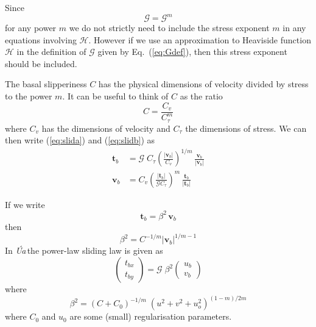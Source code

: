 \documentclass[10pt,a4paper]{book}
\newcommand{\He}{\mathcal{H}}
\newcommand{\G}{\mathcal{G}}
\newcommand{\Ua}{\textsl{\'Ua}\,}
\begin{document}
Since
\[
\G=\G^m
\]
for any power $m$ we do not strictly need to include the stress
exponent $m$ in any equations involving $\He$. However if we use an
approximation to Heaviside function $\He$ in the definition of $\G$
given by Eq.~(\ref{eq:Gdef}), then this stress exponent should be
included.

The basal slipperiness $C$ has the physical dimensions of velocity divided by
stress to the power $m$. It can be useful to think of $C$ as the ratio
\[
C= \frac{C_v}{C_{\tau}^m}
\]
where $C_v$ has the dimensions of velocity and $C_{\tau}$ the
dimensions of stress.  We can then write (\ref{eq:slida}) and
(\ref{eq:slidb}) as
\begin{align}
  \bm{t}_b   & = \G \; C_{\tau} \left ( \frac{| \bm{v}_b|}{C_v} \right )^{1/m} \, \frac{\bm{v}_b}{| \bm{v}_b | } \label{eq:slida1} \\
  \bm{v}_b   & =  C_v  \left ( \frac{ | \bm{t}_b|}{\G C_{\tau}} \right )^m \, \frac{\bm{t}_b}{| \bm{t}_b|}  \label{eq:slidb1} 
\end{align}



If we write
\[ 
\bm{t}_b=\beta^2 \, \bm{v}_b
\]
then
\[
\beta^2=C^{-1/m} | \bm{v}_b|^{1/m-1} 
\]
In  \Ua the power-law sliding law is given as
\[
  \begin{pmatrix}  t_{bx} \\ t_{by}  \end{pmatrix} 
=\G \; \beta^2    \begin{pmatrix}  u_b \\ v_b  \end{pmatrix} 
\]
where
\[
\beta^2=(C+C_0)^{-1/m} \; (u^2+v^2+u_o^2)^{(1-m)/2m}
\]
where $C_0$ and $u_0$ are some (small) regularisation parameters. 
\end{document}
